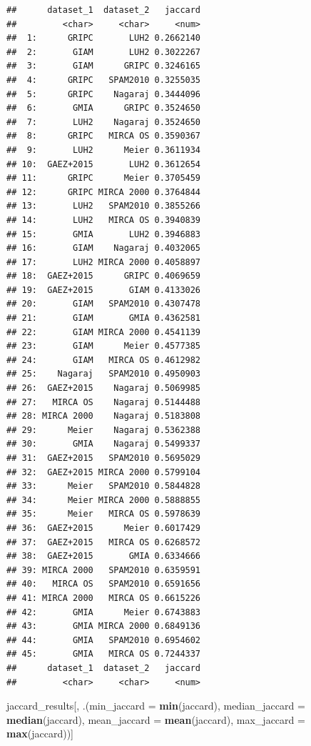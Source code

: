 \documentclass[
  11pt,
]{article}
\newenvironment{Shaded}{\begin{snugshade}}{\end{snugshade}}
\newcommand{\AttributeTok}[1]{\textcolor[rgb]{0.13,0.29,0.53}{#1}}
\newcommand{\FunctionTok}[1]{\textcolor[rgb]{0.13,0.29,0.53}{\textbf{#1}}}
\newcommand{\NormalTok}[1]{#1}
\begin{document}
\begin{verbatim}
##      dataset_1  dataset_2   jaccard
##         <char>     <char>     <num>
##  1:      GRIPC       LUH2 0.2662140
##  2:       GIAM       LUH2 0.3022267
##  3:       GIAM      GRIPC 0.3246165
##  4:      GRIPC   SPAM2010 0.3255035
##  5:      GRIPC    Nagaraj 0.3444096
##  6:       GMIA      GRIPC 0.3524650
##  7:       LUH2    Nagaraj 0.3524650
##  8:      GRIPC   MIRCA OS 0.3590367
##  9:       LUH2      Meier 0.3611934
## 10:  GAEZ+2015       LUH2 0.3612654
## 11:      GRIPC      Meier 0.3705459
## 12:      GRIPC MIRCA 2000 0.3764844
## 13:       LUH2   SPAM2010 0.3855266
## 14:       LUH2   MIRCA OS 0.3940839
## 15:       GMIA       LUH2 0.3946883
## 16:       GIAM    Nagaraj 0.4032065
## 17:       LUH2 MIRCA 2000 0.4058897
## 18:  GAEZ+2015      GRIPC 0.4069659
## 19:  GAEZ+2015       GIAM 0.4133026
## 20:       GIAM   SPAM2010 0.4307478
## 21:       GIAM       GMIA 0.4362581
## 22:       GIAM MIRCA 2000 0.4541139
## 23:       GIAM      Meier 0.4577385
## 24:       GIAM   MIRCA OS 0.4612982
## 25:    Nagaraj   SPAM2010 0.4950903
## 26:  GAEZ+2015    Nagaraj 0.5069985
## 27:   MIRCA OS    Nagaraj 0.5144488
## 28: MIRCA 2000    Nagaraj 0.5183808
## 29:      Meier    Nagaraj 0.5362388
## 30:       GMIA    Nagaraj 0.5499337
## 31:  GAEZ+2015   SPAM2010 0.5695029
## 32:  GAEZ+2015 MIRCA 2000 0.5799104
## 33:      Meier   SPAM2010 0.5844828
## 34:      Meier MIRCA 2000 0.5888855
## 35:      Meier   MIRCA OS 0.5978639
## 36:  GAEZ+2015      Meier 0.6017429
## 37:  GAEZ+2015   MIRCA OS 0.6268572
## 38:  GAEZ+2015       GMIA 0.6334666
## 39: MIRCA 2000   SPAM2010 0.6359591
## 40:   MIRCA OS   SPAM2010 0.6591656
## 41: MIRCA 2000   MIRCA OS 0.6615226
## 42:       GMIA      Meier 0.6743883
## 43:       GMIA MIRCA 2000 0.6849136
## 44:       GMIA   SPAM2010 0.6954602
## 45:       GMIA   MIRCA OS 0.7244337
##      dataset_1  dataset_2   jaccard
##         <char>     <char>     <num>
\end{verbatim}

\begin{Shaded}
\begin{Highlighting}[]
\NormalTok{jaccard\_results[, .(}\AttributeTok{min\_jaccard =} \FunctionTok{min}\NormalTok{(jaccard),}
                    \AttributeTok{median\_jaccard =} \FunctionTok{median}\NormalTok{(jaccard),}
                    \AttributeTok{mean\_jaccard =} \FunctionTok{mean}\NormalTok{(jaccard),}
                    \AttributeTok{max\_jaccard =} \FunctionTok{max}\NormalTok{(jaccard))]}
\end{Highlighting}
\end{Shaded}
\end{document}

